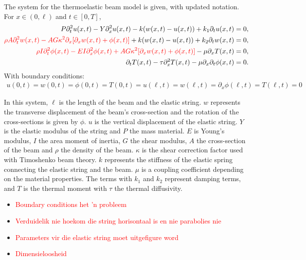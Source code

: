 \documentclass[../../main.tex]{subfiles}
\begin{document}
The system for the thermoelastic beam model is given, with updated notation. For $x \in (0,\ell)$ and $t \in [0,T]$,
\begin{eqnarray}
P \partial^2_{t} u(x,t) - Y\partial^2_x u(x,t) - k(w(x,t) - u(x,t))+ k_1 \partial_t u(x,t) = 0, \\
\textcolor{red}{\rho A \partial^2_{t}w(x,t) - AG\kappa^2 \partial_x[\partial_x w(x,t) + \phi(x,t)]} + k(w(x,t)-u(x,t)) + k_2\partial_t w(x,t) = 0,\\
\textcolor{red}{\rho I \partial^2_{t}\phi(x,t) - EI \partial^2_{x} \phi(x,t) + AG\kappa^2[\partial_x w(x,t) + \phi(x,t)]} - \mu\partial_x T(x,t) = 0,\\
\partial_t T(x,t) - \tau\partial_x^2T(x,t) - \mu \partial_{x}\partial_t\phi(x,t) = 0.
\end{eqnarray}
With boundary conditions:
\begin{eqnarray*}
 u(0,t) = w(0,t) = \phi(0,t) = T(0,t) = u(\ell,t) = w(\ell,t) = \partial_x \phi(\ell,t) = T(\ell,t) = 0
\end{eqnarray*}

In this system, $\ell$ is the length of the beam and the elastic string. $w$ represents the transverse displacement of the beam's cross-section and the rotation of the cross-sections is given by $\phi$. $u$ is the vertical displacement of the elastic string. $Y$ is the elastic modulus of the string and $P$ the mass material. $E$ is Young's modulus, $I$ the area moment of inertia, $G$ the shear modulus, $A$ the cross-section of the beam and $\rho$ the density of the beam. $\kappa$ is the shear correction factor used with Timoshenko beam theory. $k$ represents the stiffness of the elastic spring connecting the elastic string and the beam. $\mu$ is a coupling coefficient depending on the material properties. The terms with $k_1$ and $k_2$ represent damping terms, and $T$ is the thermal moment with $\tau$ the thermal diffusivity.\\

\begin{itemize}
 \item \textcolor{red}{Boundary conditions het 'n probleem}
 \item \textcolor{red}{Verduidelik nie hoekom die string horisontaal is en nie parabolies nie}
 \item \textcolor{red}{Parameters vir die elastic string moet uitgefigure word}
 \item \textcolor{red}{Dimensieloosheid}
\end{itemize}
\end{document}
